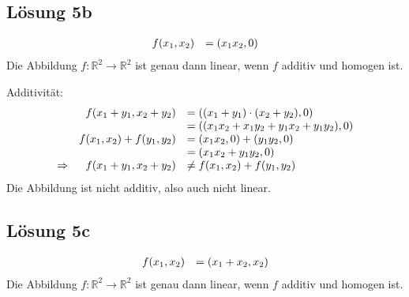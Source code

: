\documentclass[main.tex]{subfiles}
\begin{document}
\subsection{Lösung 5b}
\begin{equation*}
    \begin{array}{ r l }
    f( x_{1} ,x_{2}) & =( x_{1} x_{2} ,0)
    \end{array}
\end{equation*}
Die Abbildung $f:\mathbb{R}^{2}\rightarrow \mathbb{R}^{2}$ ist genau dann linear, wenn $f$ additiv und homogen ist.

Additivität:
\begin{equation*}
    \begin{array}{ r r l }
    & f( x_{1} +y_{1} ,x_{2} +y_{2}) & =(( x_{1} +y_{1}) \cdotp ( x_{2} +y_{2}) ,0)\\
    &  & =(( x_{1} x_{2} +x_{1} y_{2} +y_{1} x_{2} +y_{1} y_{2}) ,0)\\
    & f( x_{1} ,x_{2}) +f( y_{1} ,y_{2}) & =( x_{1} x_{2} ,0) +( y_{1} y_{2} ,0)\\
    &  & =( x_{1} x_{2} +y_{1} y_{2} ,0)\\
    \Rightarrow  & f( x_{1} +y_{1} ,x_{2} +y_{2}) & \neq f( x_{1} ,x_{2}) +f( y_{1} ,y_{2})
    \end{array}
\end{equation*}
Die Abbildung ist nicht additiv, also auch nicht linear.

\subsection{Lösung 5c}
\begin{equation*}
    \begin{array}{ r l }
    f( x_{1} ,x_{2}) & =( x_{1} +x_{2} ,x_{2})
    \end{array}
\end{equation*}
Die Abbildung $f:\mathbb{R}^{2}\rightarrow \mathbb{R}^{2}$ ist genau dann linear, wenn $f$ additiv und homogen ist.
\end{document}
